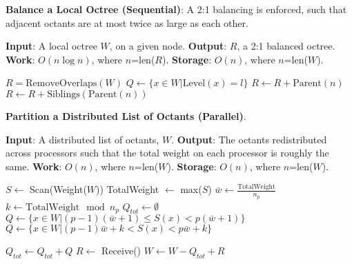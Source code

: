 \begin{algorithm}
    \caption{\textbf{Balance a Local Octree (Sequential)}: A 2:1 balancing is enforced, such that adjacent octants are at most twice as large as each other.}
    \label{alg:sec_2_4:balance_octree}
    \begin{algorithmic}
        \STATE \textbf{Input}: A local octree $W$, on a given node.
        \STATE \textbf{Output}: $R$, a 2:1 balanced octree. 
        \STATE \textbf{Work}: $O(n \log n)$, where $n$=len($R$).
        \STATE \textbf{Storage}: $O(n)$, where $n$=len($W$).

        \STATE $R = \text{RemoveOverlaps}(W)$
            \STATE $Q \gets \{ x \in W | \text{Level}(x) = l \}$
                        \STATE $R \gets R + \text{Parent}(n)$
                        \STATE $R \gets R + \text{Siblings}(\text{Parent}(n))$
                    \ENDIF
                \ENDFOR
            \ENDFOR
        \ENDFOR
    \end{algorithmic}
\end{algorithm}


\begin{algorithm}
    \caption{\textbf{Partition a Distributed List of Octants (Parallel)}.}
    \label{alg:sec_2_4:partition}
    \begin{algorithmic}
        \STATE \textbf{Input}: A distributed list of octants, $W$. 
        \STATE \textbf{Output}: The octants redistributed across processors such that the total weight on each processor is roughly the same. 
        \STATE \textbf{Work}: $O(n)$, where $n$=len($W$).
        \STATE \textbf{Storage}: $O(n)$, where $n$=len($W$).

        \STATE $S \gets$ Scan(Weight($W$))
            TotalWeight $\gets$ max($S$)
        \ENDIF
        \STATE $\bar{w} \gets \frac{\text{TotalWeight}}{n_p}$
        \STATE $k \gets \text{TotalWeight} \mod n_p$
        $Q_{tot} \gets \emptyset$
                \STATE $Q \gets \{ x \in W | (p-1)(\bar{w} + 1) \leq S(x) < p (\bar{w}+1) \}$
            \ELSE
                \STATE $Q \gets \{ x \in W | (p-1)\bar{w} + k < S(x) < p \bar{w} + k \}$
            \ENDIF

            \STATE $Q_{tot} \gets Q_{tot} + Q$
        \ENDFOR
        \STATE $R \gets$ Receive()
        \STATE $W \gets W-Q_{tot}+R$
    \end{algorithmic}
\end{algorithm}


